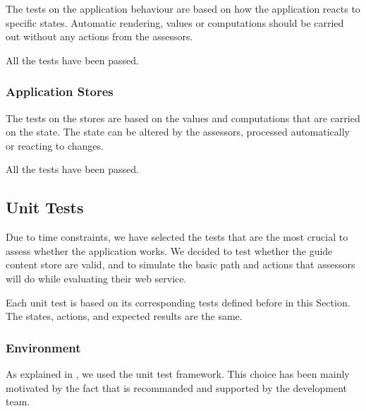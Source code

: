 The tests on the application behaviour are based on how the application reacts to specific states. Automatic rendering, values or computations should be carried out without any actions from the assessors.

All the tests have been passed.

\subsubsection{Application Stores}
\label{subsubsec:app_tests_application_store}

The tests on the stores are based on the values and computations that are carried on the state. The state can be altered by the assessors, processed automatically or reacting to changes.

All the tests have been passed.

\subsection{Unit Tests}
\label{subsec:app_tests_unit}

Due to time constraints, we have selected the tests that are the most crucial to assess whether the application works. We decided to test whether the guide content store are valid, and to simulate the basic path and actions that assessors will do while evaluating their web service.

Each unit test is based on its corresponding tests defined before in this Section. The states, actions, and expected results are the same.

\subsubsection{Environment}
\label{subsubsec:app_tests_unit_environment}

As explained in , we used the  unit test \gls{framework}. This choice has been mainly motivated by the fact that  is recommanded and supported by the  development team.

